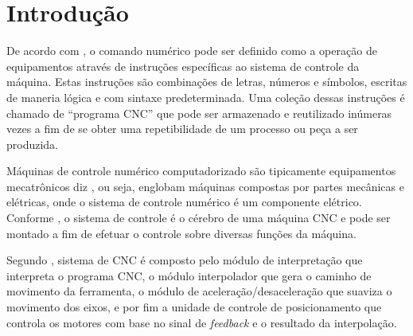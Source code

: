 
\chapter{Introdução} %
\label{chap:introducao} %

De acordo com , o comando numérico pode ser definido
como a operação de equipamentos através de instruções específicas ao sistema de
controle da máquina. Estas instruções são combinações de letras, números e
símbolos, escritas de maneria lógica e com sintaxe predeterminada. Uma coleção
dessas instruções é chamado de ``programa CNC'' que pode ser armazenado e
reutilizado inúmeras vezes a fim de se obter uma repetibilidade de um processo
ou peça a ser produzida.

Máquinas de controle numérico computadorizado são tipicamente equipamentos
mecatrônicos diz , ou seja, englobam máquinas
compostas por partes mecânicas e elétricas, onde o sistema de controle numérico
é um componente elétrico. Conforme , o
sistema de controle é o cérebro de uma máquina CNC e pode ser montado a fim de
efetuar o controle sobre diversas funções da máquina.

Segundo , sistema de CNC é composto pelo módulo de
interpretação que interpreta o programa CNC, o módulo interpolador que gera o
caminho de movimento da ferramenta, o módulo de aceleração/desaceleração que
suaviza o movimento dos eixos, e por fim a unidade de controle de posicionamento
que controla os motores com base no sinal de \emph{feedback} e o resultado da
interpolação.



